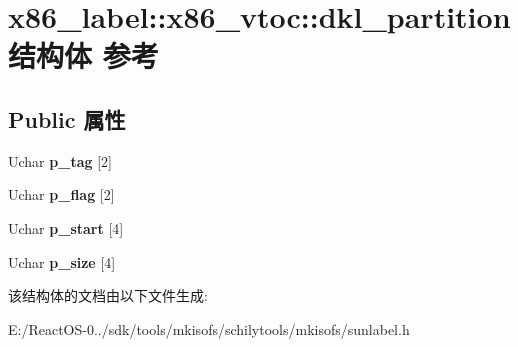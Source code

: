\hypertarget{structx86__label_1_1x86__vtoc_1_1dkl__partition}{}\section{x86\+\_\+label\+:\+:x86\+\_\+vtoc\+:\+:dkl\+\_\+partition结构体 参考}
\label{structx86__label_1_1x86__vtoc_1_1dkl__partition}
\subsection*{Public 属性}
\begin{DoxyCompactItemize}
\item 
\mbox{\label{structx86__label_1_1x86__vtoc_1_1dkl__partition_a96864a356b0522e2dc3aa81865725e7d}} 
Uchar {\bfseries p\+\_\+tag} \mbox{[}2\mbox{]}
\item 
\mbox{\label{structx86__label_1_1x86__vtoc_1_1dkl__partition_a4983ddea679105d17d06c7e3664718d0}} 
Uchar {\bfseries p\+\_\+flag} \mbox{[}2\mbox{]}
\item 
\mbox{\label{structx86__label_1_1x86__vtoc_1_1dkl__partition_a6128ae6da38d7a4a30d2a48620bf46a4}} 
Uchar {\bfseries p\+\_\+start} \mbox{[}4\mbox{]}
\item 
\mbox{\label{structx86__label_1_1x86__vtoc_1_1dkl__partition_ac9449cd52712325ca56e9d5cf215ba86}} 
Uchar {\bfseries p\+\_\+size} \mbox{[}4\mbox{]}
\end{DoxyCompactItemize}


该结构体的文档由以下文件生成\+:\begin{DoxyCompactItemize}
\item 
E\+:/\+React\+O\+S-\/0../sdk/tools/mkisofs/schilytools/mkisofs/sunlabel.\+h\end{DoxyCompactItemize}
